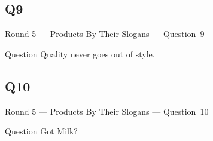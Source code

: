 \documentclass[11pt]{beamer}
\begin{document}
\subsection*{Q9}
\begin{frame}[t]{Round 5 --- Products By Their Slogans --- \mbox{Question 9}}
\begin{block}{Question}
Quality never goes out of style.
\end{block}
\end{frame}
\subsection*{Q10}
\begin{frame}[t]{Round 5 --- Products By Their Slogans --- \mbox{Question 10}}
\begin{block}{Question}
Got Milk?
\end{block}
\end{frame}
\end{document}
